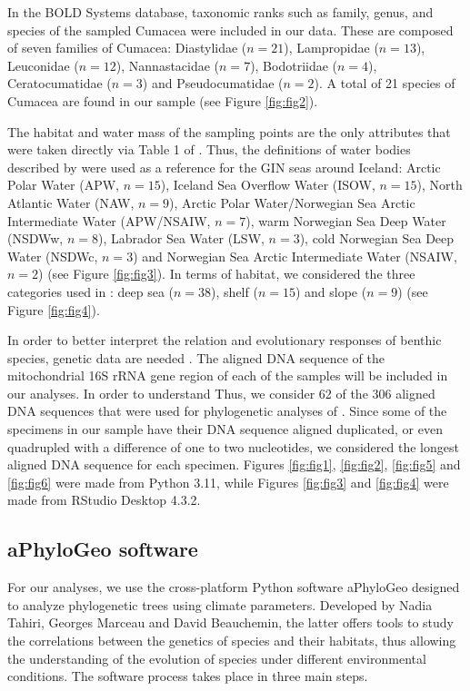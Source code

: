 In the BOLD Systems database, taxonomic ranks such as family, genus, and species of the sampled Cumacea were included in our data. These are composed of seven families of Cumacea: Diastylidae (\( n=21 \)), Lampropidae (\( n=13 \)), Leuconidae (\( n=12 \)), Nannastacidae (\( n=7 \)), Bodotriidae (\( n=4 \)), Ceratocumatidae (\( n=3 \)) and Pseudocumatidae (\( n=2 \)). A total of 21 species of Cumacea are found in our sample (see Figure \ref{fig:fig2}).

The habitat and water mass of the sampling points are the only attributes that were taken directly via Table 1 of \citep{uhlir_adding_2021}. Thus, the definitions of water bodies described by \citep{hansen_north_2000, brix2010distribution, ostmann_marine_2014} were used as a reference for the GIN seas around Iceland: Arctic Polar Water (APW, \( n=15 \)), Iceland Sea Overflow Water (ISOW, \( n=15 \)), North Atlantic Water (NAW, \( n=9 \)), Arctic Polar Water/Norwegian Sea Arctic Intermediate Water (APW/NSAIW, \( n=7 \)), warm Norwegian Sea Deep Water (NSDWw, \( n=8 \)), Labrador Sea Water (LSW, \( n=3 \)), cold Norwegian Sea Deep Water (NSDWc, \( n=3 \)) and Norwegian Sea Arctic Intermediate Water (NSAIW, \( n=2 \)) (see Figure \ref{fig:fig3}). In terms of habitat, we considered the three categories used in \citep{uhlir_adding_2021}: deep sea (\( n=38 \)), shelf (\( n=15 \)) and slope (\( n=9 \)) (see Figure \ref{fig:fig4}).

In order to better interpret the relation and evolutionary responses of benthic species, genetic data are needed \citep{wilson_speciation_1987, uhlir_adding_2021}. The aligned DNA sequence of the mitochondrial 16S rRNA gene region of each of the samples will be included in our analyses. In order to understand  Thus, we consider 62 of the 306 aligned DNA sequences that were used for phylogenetic analyses of \citep{uhlir_adding_2021}. Since some of the specimens in our sample have their DNA sequence aligned duplicated, or even quadrupled with a difference of one to two nucleotides, we considered the longest aligned DNA sequence for each specimen. Figures  \ref{fig:fig1},  \ref{fig:fig2}, \ref{fig:fig5} and \ref{fig:fig6} were made from Python 3.11, while Figures \ref{fig:fig3} and \ref{fig:fig4} were made from RStudio Desktop 4.3.2.

\subsection{aPhyloGeo software}

For our analyses, we use the cross-platform Python software aPhyloGeo designed to analyze phylogenetic trees using climate parameters. Developed by Nadia Tahiri, Georges Marceau and David Beauchemin, the latter offers tools to study the correlations between the genetics of species and their habitats, thus allowing the understanding of the evolution of species under different environmental conditions. The software process takes place in three main steps. 

